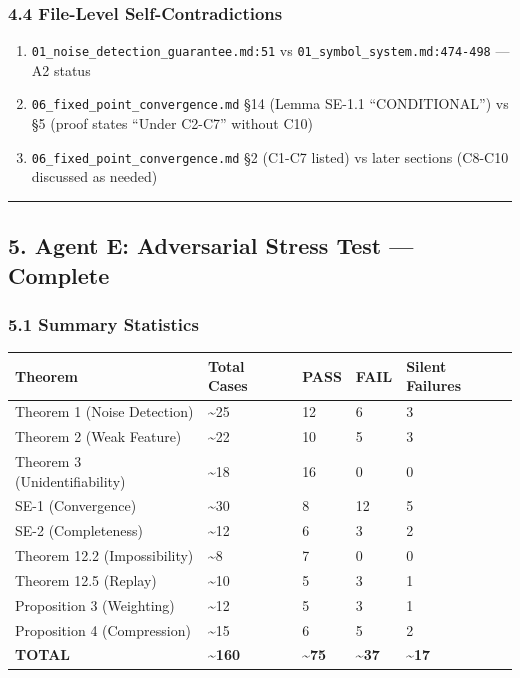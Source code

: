 \documentclass[
  12pt,
]{ctexart}
\providecommand{\tightlist}{%
  \setlength{\itemsep}{0pt}\setlength{\parskip}{0pt}}
\begin{document}
\subsubsection{4.4 File-Level
Self-Contradictions}\label{file-level-self-contradictions}

\begin{enumerate}
\def\labelenumi{\arabic{enumi}.}
\tightlist
\item
  \texttt{01\_noise\_detection\_guarantee.md:51} vs
  \texttt{01\_symbol\_system.md:474-498} --- A2 status
\item
  \texttt{06\_fixed\_point\_convergence.md} §14 (Lemma SE-1.1
  ``CONDITIONAL'') vs §5 (proof states ``Under C2-C7'' without C10)
\item
  \texttt{06\_fixed\_point\_convergence.md} §2 (C1-C7 listed) vs later
  sections (C8-C10 discussed as needed)
\end{enumerate}

\begin{center}\rule{0.5\linewidth}{0.5pt}\end{center}

\subsection{5. Agent E: Adversarial Stress Test ---
Complete}\label{agent-e-adversarial-stress-test-complete}

\subsubsection{5.1 Summary Statistics}\label{summary-statistics}

\begin{longtable}[]{@{}lllll@{}}
\toprule\noalign{}
Theorem & Total Cases & PASS & FAIL & Silent Failures \\
\midrule\noalign{}
\endhead
\bottomrule\noalign{}
\endlastfoot
Theorem 1 (Noise Detection) & \textasciitilde25 & 12 & 6 & 3 \\
Theorem 2 (Weak Feature) & \textasciitilde22 & 10 & 5 & 3 \\
Theorem 3 (Unidentifiability) & \textasciitilde18 & 16 & 0 & 0 \\
SE-1 (Convergence) & \textasciitilde30 & 8 & 12 & 5 \\
SE-2 (Completeness) & \textasciitilde12 & 6 & 3 & 2 \\
Theorem 12.2 (Impossibility) & \textasciitilde8 & 7 & 0 & 0 \\
Theorem 12.5 (Replay) & \textasciitilde10 & 5 & 3 & 1 \\
Proposition 3 (Weighting) & \textasciitilde12 & 5 & 3 & 1 \\
Proposition 4 (Compression) & \textasciitilde15 & 6 & 5 & 2 \\
\textbf{TOTAL} & \textbf{\textasciitilde160} &
\textbf{\textasciitilde75} & \textbf{\textasciitilde37} &
\textbf{\textasciitilde17} \\
\end{longtable}
\end{document}
